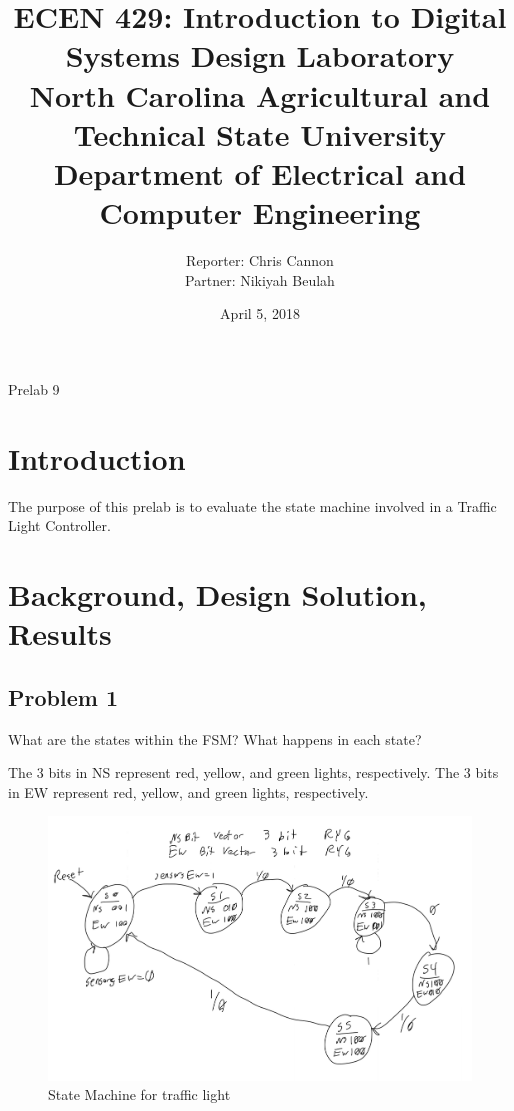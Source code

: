 \documentclass[11pt]{article}
\title {{\titleFont ECEN 429: Introduction to Digital Systems Design Laboratory \\ North Carolina Agricultural and Technical State University \\ Department of Electrical and Computer Engineering}} %
\author{\titleFont Reporter: Chris Cannon \\ Partner: Nikiyah Beulah} %
\date{\titleFont April 5, 2018}
\begin{document}
\begin{titlingpage}
\maketitle
\begin{center}
	Prelab 9
\end{center}
\end{titlingpage}

\section{Introduction}
The purpose of this prelab is to evaluate the state machine involved in a Traffic Light Controller.

\section{Background, Design Solution, Results}
\subsection{Problem 1}
What are the states within the FSM? What happens in each state?

The 3 bits in NS represent red, yellow, and green lights, respectively.
The 3 bits in EW represent red, yellow, and green lights, respectively.

\begin{figure}[H]
\begin{center}
	\includegraphics[width=\textwidth]{./9images/trafficLight.png}
	\caption{\label{fig:trafficLight} State Machine for traffic light}
\end{center}
\end{figure}
\end{document}
